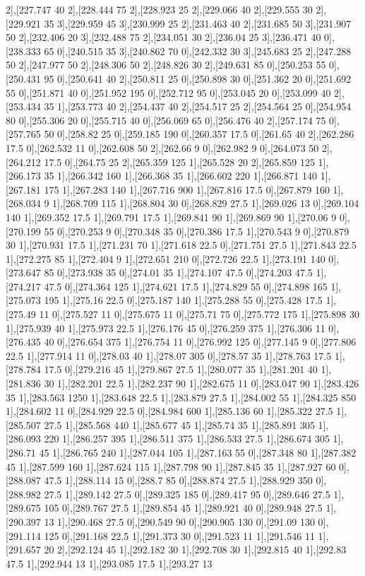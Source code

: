 {2],[227.747 40 2],[228.444 75 2],[228.923 25 2],[229.066 40 2],[229.555 30 2],[229.921 35 3],[229.959 45 3],[230.999 25 2],[231.463 40 2],[231.685 50 3],[231.907 50 2],[232.406 20 3],[232.488 75 2],[234.051 30 2],[236.04 25 3],[236.471 40 0],[238.333 65 0],[240.515 35 3],[240.862 70 0],[242.332 30 3],[245.683 25 2],[247.288 50 2],[247.977 50 2],[248.306 50 2],[248.826 30 2],[249.631 85 0],[250.253 55 0],[250.431 95 0],[250.641 40 2],[250.811 25 0],[250.898 30 0],[251.362 20 0],[251.692 55 0],[251.871 40 0],[251.952 195 0],[252.712 95 0],[253.045 20 0],[253.099 40 2],[253.434 35 1],[253.773 40 2],[254.437 40 2],[254.517 25 2],[254.564 25 0],[254.954 80 0],[255.306 20 0],[255.715 40 0],[256.069 65 0],[256.476 40 2],[257.174 75 0],[257.765 50 0],[258.82 25 0],[259.185 190 0],[260.357 17.5 0],[261.65 40 2],[262.286 17.5 0],[262.532 11 0],[262.608 50 2],[262.66 9 0],[262.982 9 0],[264.073 50 2],[264.212 17.5 0],[264.75 25 2],[265.359 125 1],[265.528 20 2],[265.859 125 1],[266.173 35 1],[266.342 160 1],[266.368 35 1],[266.602 220 1],[266.871 140 1],[267.181 175 1],[267.283 140 1],[267.716 900 1],[267.816 17.5 0],[267.879 160 1],[268.034 9 1],[268.709 115 1],[268.804 30 0],[268.829 27.5 1],[269.026 13 0],[269.104 140 1],[269.352 17.5 1],[269.791 17.5 1],[269.841 90 1],[269.869 90 1],[270.06 9 0],[270.199 55 0],[270.253 9 0],[270.348 35 0],[270.386 17.5 1],[270.543 9 0],[270.879 30 1],[270.931 17.5 1],[271.231 70 1],[271.618 22.5 0],[271.751 27.5 1],[271.843 22.5 1],[272.275 85 1],[272.404 9 1],[272.651 210 0],[272.726 22.5 1],[273.191 140 0],[273.647 85 0],[273.938 35 0],[274.01 35 1],[274.107 47.5 0],[274.203 47.5 1],[274.217 47.5 0],[274.364 125 1],[274.621 17.5 1],[274.829 55 0],[274.898 165 1],[275.073 195 1],[275.16 22.5 0],[275.187 140 1],[275.288 55 0],[275.428 17.5 1],[275.49 11 0],[275.527 11 0],[275.675 11 0],[275.71 75 0],[275.772 175 1],[275.898 30 1],[275.939 40 1],[275.973 22.5 1],[276.176 45 0],[276.259 375 1],[276.306 11 0],[276.435 40 0],[276.654 375 1],[276.754 11 0],[276.992 125 0],[277.145 9 0],[277.806 22.5 1],[277.914 11 0],[278.03 40 1],[278.07 305 0],[278.57 35 1],[278.763 17.5 1],[278.784 17.5 0],[279.216 45 1],[279.867 27.5 1],[280.077 35 1],[281.201 40 1],[281.836 30 1],[282.201 22.5 1],[282.237 90 1],[282.675 11 0],[283.047 90 1],[283.426 35 1],[283.563 1250 1],[283.648 22.5 1],[283.879 27.5 1],[284.002 55 1],[284.325 850 1],[284.602 11 0],[284.929 22.5 0],[284.984 600 1],[285.136 60 1],[285.322 27.5 1],[285.507 27.5 1],[285.568 440 1],[285.677 45 1],[285.74 35 1],[285.891 305 1],[286.093 220 1],[286.257 395 1],[286.511 375 1],[286.533 27.5 1],[286.674 305 1],[286.71 45 1],[286.765 240 1],[287.044 105 1],[287.163 55 0],[287.348 80 1],[287.382 45 1],[287.599 160 1],[287.624 115 1],[287.798 90 1],[287.845 35 1],[287.927 60 0],[288.087 47.5 1],[288.114 15 0],[288.7 85 0],[288.874 27.5 1],[288.929 350 0],[288.982 27.5 1],[289.142 27.5 0],[289.325 185 0],[289.417 95 0],[289.646 27.5 1],[289.675 105 0],[289.767 27.5 1],[289.854 45 1],[289.921 40 0],[289.948 27.5 1],[290.397 13 1],[290.468 27.5 0],[290.549 90 0],[290.905 130 0],[291.09 130 0],[291.114 125 0],[291.168 22.5 1],[291.373 30 0],[291.523 11 1],[291.546 11 1],[291.657 20 2],[292.124 45 1],[292.182 30 1],[292.708 30 1],[292.815 40 1],[292.83 47.5 1],[292.944 13 1],[293.085 17.5 1],[293.27 13 }
